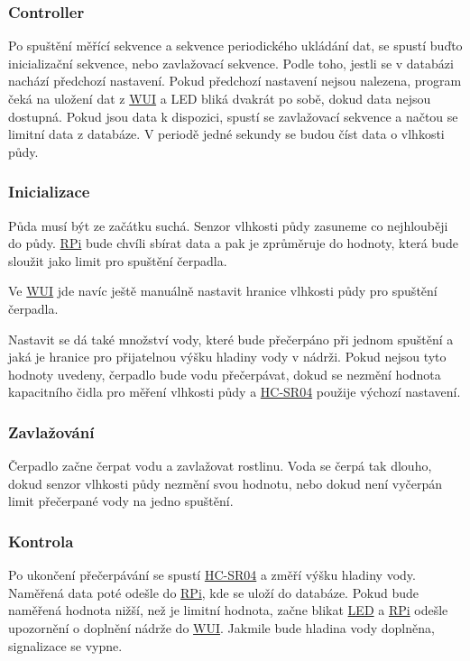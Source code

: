 \documentclass[czech,12pt,a4paper]{article}
\begin{document}
\subsubsection{Controller}

Po spuštění měřící sekvence a sekvence periodického ukládání dat, se spustí buďto inicializační sekvence, nebo zavlažovací sekvence. Podle toho, jestli se v databázi nachází předchozí nastavení. Pokud předchozí nastavení nejsou nalezena, program čeká na uložení dat z \space \underline{\ac{WUI}} a \ac{LED} bliká dvakrát po sobě, dokud data nejsou dostupná. Pokud jsou data k dispozici, spustí se zavlažovací sekvence a načtou se limitní data z databáze. V periodě jedné sekundy se budou číst data o vlhkosti půdy.

\subsubsection{Inicializace}

Půda musí být ze začátku suchá. Senzor vlhkosti půdy zasuneme co nejhlouběji do půdy. \underline{\ac{RPi}} bude chvíli sbírat data a pak je zprůměruje do hodnoty, která bude sloužit jako limit pro spuštění čerpadla.

Ve \underline{\ac{WUI}} jde navíc ještě manuálně nastavit hranice vlhkosti půdy pro spuštění čerpadla.

Nastavit se dá také množství vody, které bude přečerpáno při jednom spuštění a jaká je hranice pro přijatelnou výšku hladiny vody v nádrži. Pokud nejsou tyto hodnoty uvedeny, čerpadlo bude vodu přečerpávat, dokud se nezmění hodnota kapacitního čidla pro měření vlhkosti půdy a \space \underline{\ac{HC-SR04}} použije výchozí nastavení.

\subsubsection{Zavlažování}

Čerpadlo začne čerpat vodu a zavlažovat rostlinu. Voda se čerpá tak dlouho, dokud senzor vlhkosti půdy nezmění svou hodnotu, nebo dokud není vyčerpán limit přečerpané vody na jedno spuštění.

\subsubsection{Kontrola}

Po ukončení přečerpávání se spustí \underline{\ac{HC-SR04}} a změří výšku hladiny vody. Naměřená data poté odešle do \underline{\ac{RPi}}, kde se uloží do databáze. Pokud bude naměřená hodnota nižší, než je limitní hodnota, začne blikat \underline{\ac{LED}} a \underline{\ac{RPi}} odešle upozornění o doplnění nádrže do \underline{\ac{WUI}}. Jakmile bude hladina vody doplněna, signalizace se vypne.
\end{document}

